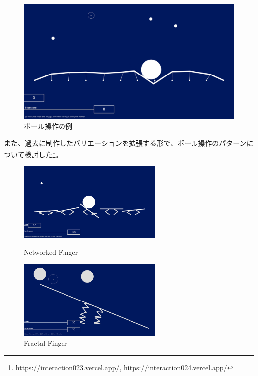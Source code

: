 \begin{figure}[H]
  \centering
  \includegraphics[width=15cm]{img/ball_overview.png}
  \caption{ボール操作の例}
  \label{fig:ball_overview}
\end{figure}

また、過去に制作したバリエーションを拡張する形で、ボール操作のパターンについて検討した\footnote{\url{https://interaction023.vercel.app/}, \url{https://interaction024.vercel.app/}}。

\begin{figure}[htbp]
  \begin{minipage}[b]{0.5\linewidth}
    \centering
    \includegraphics[keepaspectratio, width=7cm]{img/ball_0.png}
    \caption{Networked Finger}
    \label{fig:ball_0}
  \end{minipage}
  \begin{minipage}[b]{0.5\linewidth}
    \centering
    \includegraphics[keepaspectratio, width=7cm]{img/ball_1.png}
    \caption{Fractal Finger}
    \label{fig:ball_1}
  \end{minipage}
\end{figure}

